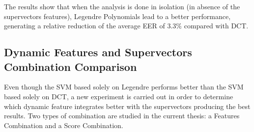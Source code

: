 The results show that when the analysis is done in isolation (in absence of the supervectors
features), Legendre Polynomials lead to a better performance, generating a relative reduction
of the average EER of 3.3\% compared with DCT.

\subsection{Dynamic Features and Supervectors Combination Comparison}

Even though the SVM based solely on Legendre performs better than the SVM based solely on
DCT, a new experiment is carried out in order to determine which
dynamic feature integrates better
with the supervectors producing the best results. Two types of combination are
studied in the current thesis: a Features Combination and a Score
Combination.


